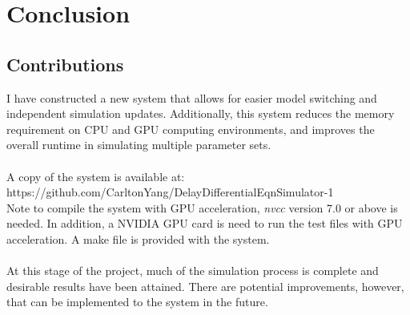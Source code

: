\documentclass[../thesis.tex]{subfiles}
\begin{document}
\chapter{Conclusion}
\section{Contributions}
I have constructed a new system that allows for easier model switching and independent simulation updates. Additionally, this system reduces the memory requirement on CPU and GPU computing environments, and improves the overall runtime in simulating multiple parameter sets. \\
\\
A copy of the system is available at: \\
https://github.com/CarltonYang/DelayDifferentialEqnSimulator-1\\
Note to compile the system with GPU acceleration, \textit{nvcc} version 7.0 or above is needed. In addition, a NVIDIA GPU card is need to run the test files with GPU acceleration. A make file is provided with the system.\\
\\
At this stage of the project, much of the simulation process is complete and desirable results have been attained. There are potential improvements, however, that can be implemented to the system in the future. 
\end{document}
